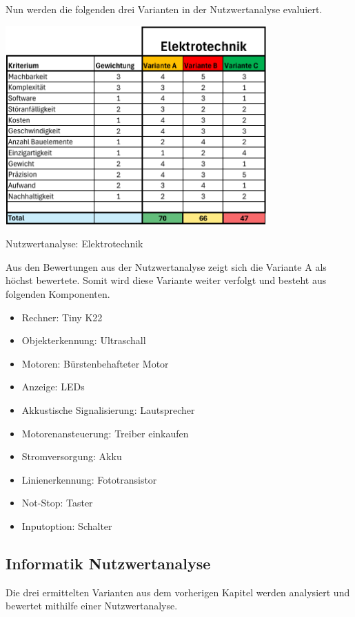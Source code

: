 Nun werden die folgenden drei Varianten in der Nutzwertanalyse evaluiert.




\begin{table}[H]
\centering
\includegraphics[width=0.75\textwidth]{assets/Nutzwertanalyse-ET.pdf}
\caption{Nutzwertanalyse: Elektrotechnik}
\label{table:nutzwert-ET}
\end{table}

Aus den Bewertungen aus der Nutzwertanalyse zeigt sich die Variante A als höchst bewertete. Somit wird diese Variante weiter verfolgt und besteht aus folgenden Komponenten.

\begin{itemize}
    \item Rechner: Tiny K22
    \item Objekterkennung: Ultraschall
    \item Motoren: Bürstenbehafteter Motor
    \item Anzeige: LEDs 
    \item Akkustische Signalisierung: Lautsprecher
    \item Motorenansteuerung: Treiber einkaufen
    \item Stromversorgung: Akku
    \item Linienerkennung: Fototransistor
    \item Not-Stop: Taster
    \item Inputoption: Schalter
\end{itemize}

\subsection{Informatik Nutzwertanalyse}

Die drei ermittelten Varianten aus dem vorherigen Kapitel werden analysiert und bewertet mithilfe einer Nutzwertanalyse.

